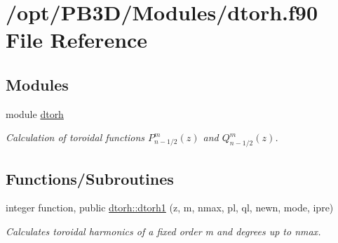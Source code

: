 \hypertarget{dtorh_8f90}{}\section{/opt/\+P\+B3\+D/\+Modules/dtorh.f90 File Reference}
\label{dtorh_8f90}
\subsection*{Modules}
\begin{DoxyCompactItemize}
\item 
module \hyperlink{namespacedtorh}{dtorh}
\begin{DoxyCompactList}\small\item\em Calculation of toroidal functions $P_{n-1/2}^m \left(z\right)$ and $Q_{n-1/2}^m \left(z\right)$. \end{DoxyCompactList}\end{DoxyCompactItemize}
\subsection*{Functions/\+Subroutines}
\begin{DoxyCompactItemize}
\item 
integer function, public \hyperlink{namespacedtorh_af3f58b6705da916bfbaf7cc4ea05f610}{dtorh\+::dtorh1} (z, m, nmax, pl, ql, newn, mode, ipre)
\begin{DoxyCompactList}\small\item\em Calculates toroidal harmonics of a fixed order {\ttfamily m} and degrees up to {\ttfamily nmax}. \end{DoxyCompactList}\end{DoxyCompactItemize}
